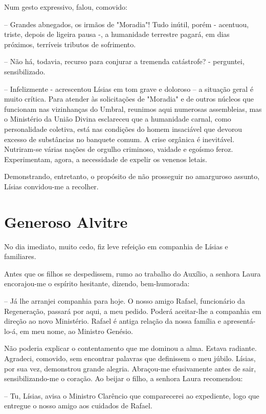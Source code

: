 \documentclass[portuguese,12pt,a4paper]{scrbook}
\begin{document}
	Num gesto expressivo, falou, comovido:
	
	– Grandes abnegados, os irmãos de "Moradia"! Tudo inútil, porém - acentuou, triste, depois de ligeira pausa -, a humanidade terrestre pagará, em dias próximos, terríveis tributos de sofrimento.
	
	– Não há, todavia, recurso para conjurar a tremenda catástrofe? - perguntei, sensibilizado.
	
	– Infelizmente - acrescentou Lísias em tom grave e doloroso – a situação geral é muito crítica. Para atender às solicitações de "Moradia" e de outros núcleos que funcionam nas vizinhanças do Umbral, reunimos aqui numerosas assembleias, mas o Ministério da União Divina esclareceu que a humanidade carnal, como personalidade coletiva, está nas condições do homem insaciável que devorou excesso de substâncias no banquete comum. A crise orgânica é inevitável. Nutriram-se várias nações de orgulho criminoso, vaidade e egoísmo feroz. Experimentam, agora, a necessidade de expelir os venenos letais.
	
	Demonstrando, entretanto, o propósito de não prosseguir no amarguroso assunto, Lísias convidou-me a recolher.
	
	
	\chapter{Generoso Alvitre}
	
	No dia imediato, muito cedo, fiz leve refeição em companhia de Lísias e familiares.
	
	Antes que os filhos se despedissem, rumo ao trabalho do Auxílio, a senhora Laura encorajou-me o espírito hesitante, dizendo, bem-humorada:
	
	– Já lhe arranjei companhia para hoje. O nosso amigo Rafael, funcionário da Regeneração, passará por aqui, a meu pedido. Poderá aceitar-lhe a companhia em direção ao novo Ministério. Rafael é antiga relação da nossa família e apresentá-lo-á, em meu nome, ao Ministro Genésio.
	
	Não poderia explicar o contentamento que me dominou a alma. Estava radiante. Agradeci, comovido, sem encontrar palavras que definissem o meu júbilo. Lísias, por sua vez, demonstrou grande alegria. Abraçou-me efusivamente antes de sair, sensibilizando-me o coração. Ao beijar o filho, a senhora Laura recomendou:
	
	– Tu, Lísias, avisa o Ministro Clarêncio que comparecerei ao expediente, logo que entregue o nosso amigo aos cuidados de Rafael.
	
\end{document}
